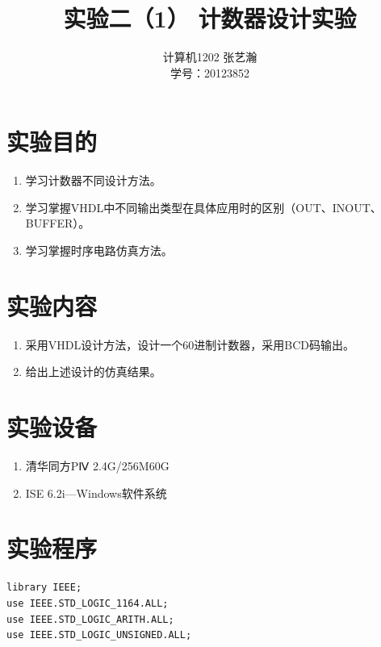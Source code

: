 \documentclass{article}
\begin{document}
\begin{CJK*}{UTF8}{gbsn}
\CJKtilde

\title{实验二（1） 计数器设计实验}

\author{计算机1202 张艺瀚\\学号：20123852}
\maketitle

\section{实验目的}
\begin{enumerate}
\item 学习计数器不同设计方法。
\item 学习掌握VHDL中不同输出类型在具体应用时的区别（OUT、INOUT、BUFFER）。
\item 学习掌握时序电路仿真方法。
\end{enumerate}

\section{实验内容}
\begin{enumerate}
\item 采用VHDL设计方法，设计一个60进制计数器，采用BCD码输出。
\item 给出上述设计的仿真结果。
\end{enumerate}

\section{实验设备}
\begin{enumerate}
\item 清华同方PⅣ 2.4G/256M60G
\item ISE 6.2i—Windows软件系统
\end{enumerate}


\section{实验程序}
\begin{center}
\begin{lstlisting}[caption = {60进制计数器代码清单}, label = {lst: counterlst}]
library IEEE;
use IEEE.STD_LOGIC_1164.ALL;
use IEEE.STD_LOGIC_ARITH.ALL;
use IEEE.STD_LOGIC_UNSIGNED.ALL;


\end{lstlisting}
\end{center}
\end{CJK*}
\end{document}
